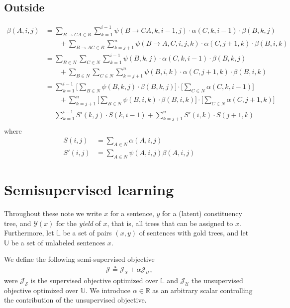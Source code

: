 \documentclass[examplefnt,biber]{nowfnt} %
\begin{document}
\section{Outside}
\begin{align*}
    \beta(A, i, j) &= \sum_{B \to C A \in R} \sum_{k=1}^{i-1} \psi(B \to C A, k, i-1, j) \cdot \alpha(C, k, i-1) \cdot \beta(B, k, j) \\
            &\qquad + \sum_{B \to A C \in R} \sum_{k=j+1}^{n} \psi(B \to A, C, i, j, k) \cdot \alpha(C, j+1, k) \cdot \beta(B, i, k) \\
        &= \sum_{B \in N} \sum_{C \in N} \sum_{k=1}^{i-1} \psi(B, k, j) \cdot \alpha(C, k, i-1) \cdot \beta(B, k, j) \\
            &\qquad + \sum_{B \in N} \sum_{C \in N} \sum_{k=j+1}^{n} \psi(B, i, k) \cdot \alpha(C, j+1, k) \cdot \beta(B, i, k) \\
        &=  \sum_{k=1}^{i-1}  \Bigg[ \sum_{B \in N} \psi(B, k, j)  \cdot \beta(B, k, j) \Bigg] \cdot \Bigg[ \sum_{C \in N} \alpha(C, k, i-1) \Bigg] \\
            &\qquad + \sum_{k=j+1}^{n}  \Bigg[ \sum_{B \in N}  \psi(B, i, k) \cdot \beta(B, i, k) \Bigg] \cdot  \Bigg[ \sum_{C \in N} \alpha(C, j+1, k) \Bigg] \\
        &=  \sum_{k=1}^{i-1}  S'(k, j) \cdot S(k, i-1) + \sum_{k=j+1}^{n} S'(i, k) \cdot  S(j+1, k) \\
\end{align*}
where
\begin{align*}
    S(i, j) &= \sum_{A \in N} \alpha(A, i, j) \\
    S'(i, j) &= \sum_{A \in N} \psi(A, i, j) \beta(A, i, j)
\end{align*}


\chapter{Semisupervised learning}

Throughout these note we write $x$ for a sentence, $y$ for a (latent) constituency tree, and $\mathcal{Y}(x)$ for the \textit{yield} of $x$, that is, all trees that can be assigned to $x$. Furthermore, let $\mathbb{L}$ be a set of pairs $(x, y)$ of sentences with gold trees, and let $\mathbb{U}$ be a set of unlabeled sentences $x$.

We define the following semi-supervised objective
\begin{align}
    \mathcal{J} \triangleq \mathcal{J}_{\mathcal{S}} + \alpha \mathcal{J}_{\mathcal{U}},
\end{align}
were $\mathcal{J}_{\mathcal{S}}$ is the supervised objective optimized over $\mathbb{L}$ and $\mathcal{J}_{\mathcal{U}}$ the unsupervised objective optimized over $\mathbb{U}$. We introduce $\alpha \in \mathbb{R}$ as an arbitrary scalar controlling the contribution of the unsupervised objective.
\end{document}
